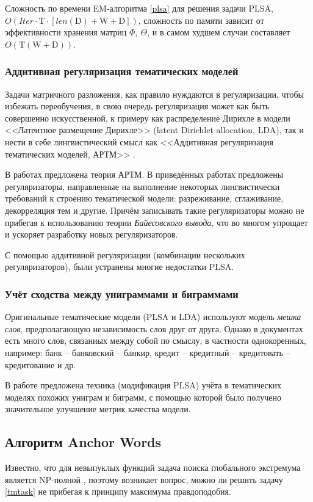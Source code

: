 \documentclass[a4paper, 14pt]{extarticle}
\begin{document}
Сложность по времени EM-алгоритма \ref{plsa} для решения задачи PLSA, $\mathit{O} (Iter \cdot \mathrm{T} \cdot [len(\mathrm{D})+\mathrm{W}+ \mathrm{D}])$, сложность по памяти зависит от эффективности хранения матриц $\Phi,~\Theta$, и в самом худшем случаи составляет $\mathit{O}(\textrm{T}(\textrm{W}+\textrm{D}))$.

\subsubsection*{Аддитивная регуляризация тематических моделей}
Задачи матричного разложения, как правило нуждаются в регуляризации, чтобы избежать переобучения, в свою очередь регуляризация может как быть совершенно искусственной, к примеру как распределение Дирихле в модели <<Латентное размещение Дирихле>> (latent Dirichlet
allocation, LDA)\cite{Blei03}, так и нести в себе лингвистический смысл как <<Аддитивная регуляризация тематических моделей, АРТМ>> \cite{ARTM}.

В работах \cite{ARTM, Voron13, Voron15slides} предложена теория АРТМ. В приведённых работах предложены регуляризаторы, направленные на выполнение некоторых лингвистически требований к строению тематической модели: разреживание, сглаживание, декорреляция тем и другие. Причём записывать такие регуляризаторы можно не прибегая к использованию теории \emph{Байесовского вывода}, что во многом упрощает и ускоряет разработку новых регуляризаторов.

С помощью аддитивной регуляризации (комбинации нескольких регуляризаторов), были устранены многие недостатки PLSA.

\subsubsection*{Учёт сходства между униграммами и биграммами}
Оригинальные тематические модели (PLSA и LDA) используют модель \emph{мешка слов}, предполагающую независимость слов друг от друга. Однако в документах есть много слов, связанных между собой по смыслу, в частности однокоренных, например: банк -- банковский -- банкир, кредит -- кредитный -- кредитовать -- кредитование и др.

В работе \cite{Nokel} предложена техника (модификация PLSA) учёта в тематических моделях похожих униграм и биграмм, с помощью которой было получено значительное улучшение метрик качества модели.

   	
\subsection{Алгоритм Anchor Words}
Известно, что для невыпуклых функций задача поиска глобального экстремума является NP-полной \cite{Kreinovich05}, поэтому возникает вопрос, можно ли решить задачу \ref{tmtask} не прибегая к принципу максимума правдоподобия.
\end{document}
